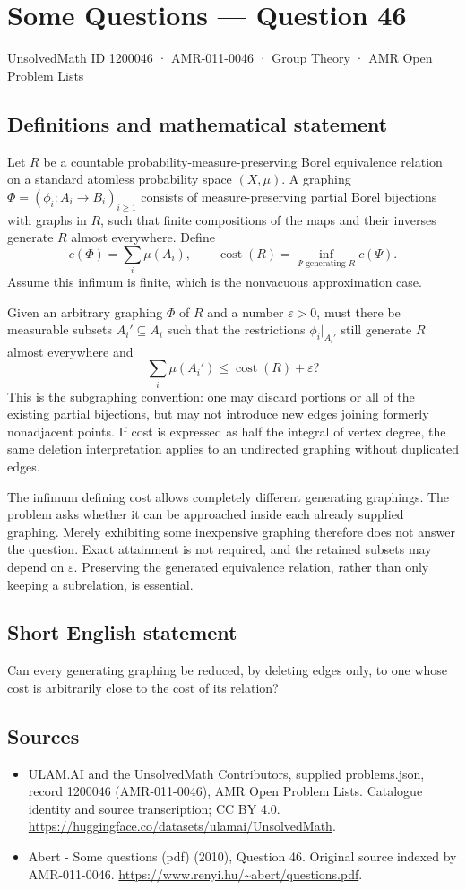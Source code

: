 \documentclass[11pt,a4paper]{article}
\begin{document}
\section*{Some Questions — Question 46}\label{1200046}
{\small UnsolvedMath ID 1200046 · AMR-011-0046 · Group Theory · AMR Open Problem Lists}
\subsection{Definitions and mathematical statement}
Let $R$ be a countable probability-measure-preserving Borel equivalence relation on a standard atomless probability space $(X,\mu)$. A graphing $\Phi=(\phi_i:A_i\to B_i)_{i\geq1}$ consists of measure-preserving partial Borel bijections with graphs in $R$, such that finite compositions of the maps and their inverses generate $R$ almost everywhere. Define
\[
 c(\Phi)=\sum_i\mu(A_i),\qquad
 \operatorname{cost}(R)=\inf_{\Psi\text{ generating }R}c(\Psi).
\]
Assume this infimum is finite, which is the nonvacuous approximation case.

Given an arbitrary graphing $\Phi$ of $R$ and a number $\varepsilon>0$, must there be measurable subsets $A_i'\subseteq A_i$ such that the restrictions $\phi_i|_{A_i'}$ still generate $R$ almost everywhere and
\[
 \sum_i\mu(A_i')\leq\operatorname{cost}(R)+\varepsilon?
\]
This is the subgraphing convention: one may discard portions or all of the existing partial bijections, but may not introduce new edges joining formerly nonadjacent points. If cost is expressed as half the integral of vertex degree, the same deletion interpretation applies to an undirected graphing without duplicated edges.

The infimum defining cost allows completely different generating graphings. The problem asks whether it can be approached inside each already supplied graphing. Merely exhibiting some inexpensive graphing therefore does not answer the question. Exact attainment is not required, and the retained subsets may depend on $\varepsilon$. Preserving the generated equivalence relation, rather than only keeping a subrelation, is essential.
\subsection{Short English statement}
Can every generating graphing be reduced, by deleting edges only, to one whose cost is arbitrarily close to the cost of its relation?
\subsection{Sources}
\begin{itemize}
\item[S1] ULAM.AI and the UnsolvedMath Contributors, supplied problems.json, record 1200046 (AMR-011-0046), AMR Open Problem Lists. Catalogue identity and source transcription; CC BY 4.0.
\url{https://huggingface.co/datasets/ulamai/UnsolvedMath}.
\item[S2] Abert - Some questions (pdf) (2010), Question 46. Original source indexed by AMR-011-0046.
\url{https://www.renyi.hu/~abert/questions.pdf}.
\end{itemize}
\end{document}
